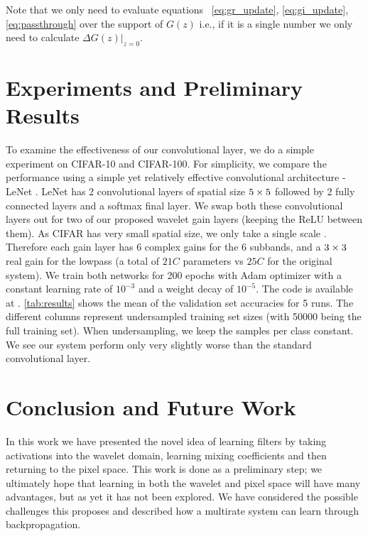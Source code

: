 Note that we only need to evaluate equations ~\ref{eq:gr_update},
\ref{eq:gi_update},\ref{eq:passthrough} over the support of
$G(z)$ i.e., if it is a single number we only need to calculate $\left.\Delta
G(z)\right\rvert_{z=0}$.

\section{Experiments and Preliminary Results}\label{sec:results} To examine the
effectiveness of our convolutional layer, we do a simple experiment on CIFAR-10
and CIFAR-100. For simplicity, we compare the performance using a simple yet
relatively effective convolutional architecture - LeNet
\cite{lecun_gradient-based_1998}. LeNet has 2 convolutional layers of spatial
size $5\times 5$ followed by 2 fully connected layers and a softmax final layer. We
swap both these convolutional layers out for two of our proposed wavelet gain
layers (keeping the ReLU between them). As CIFAR has very small spatial size, we
only take a single scale \DTCWT\@. Therefore each gain layer has $6$ complex
gains for the 6 subbands, and a $3\times 3$ real gain for the lowpass (a total of
$21C$ parameters vs $25C$ for the original system). We train both networks for
200 epochs with Adam \cite{kingma_adam:_2014} optimizer with a constant learning
rate of $10^{-3}$ and a weight decay of $10^{-5}$. The code is available at
\cite{cotter_dtcwt_2018}. \autoref{tab:results} shows the mean of the validation
set accuracies for 5 runs. The different columns represent undersampled training
set sizes (with 50000 being the full training set). When undersampling, we keep
the samples per class constant. We see our system perform only very slightly
worse than the standard convolutional layer. 

\section{Conclusion and Future Work}

In this work we have presented the novel idea of learning filters by taking
activations into the wavelet domain, learning mixing coefficients and then
returning to the pixel space. This work is done as a preliminary step; we
ultimately hope that learning in both the wavelet and pixel space will have many
advantages, but as yet it has not been explored. We have considered the possible
challenges this proposes and described how a multirate system can learn through
backpropagation.  


